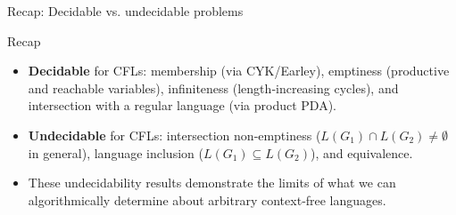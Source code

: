 \begin{frame}[t]{Recap: Decidable vs. undecidable problems}
  \begin{tfacetbox}{Recap}
    \begin{itemize}
      \item \textbf{Decidable} for CFLs: membership (via CYK/Earley),
        emptiness (productive and reachable variables), infiniteness
        (length‑increasing cycles), and intersection with a regular
        language (via product PDA).
      \item \textbf{Undecidable} for CFLs: intersection non‑emptiness
        ($L(G_1) \cap L(G_2) \ne \emptyset$ in general), language
        inclusion ($L(G_1) \subseteq L(G_2)$), and equivalence.
      \item These undecidability results demonstrate the limits of what
        we can algorithmically determine about arbitrary context‑free
        languages.
    \end{itemize}
  \end{tfacetbox}
  \label{fr:6.3-11}
\end{frame}


